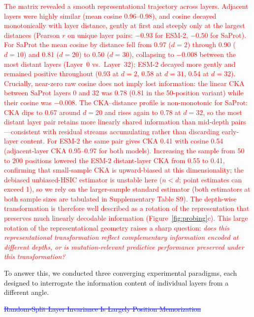\documentclass[11pt,a4paper]{article}
\newcommand{\rev}[1]{\textcolor{red}{#1}}
\begin{document}
\textcolor{red}{The matrix revealed a smooth representational trajectory across layers. Adjacent layers
were highly similar \rev{(mean cosine 0.96--0.98)}, and \rev{cosine decayed
monotonically with layer distance, gently at first and steeply only at the
largest distances (Pearson $r$ on unique layer pairs: $-0.93$ for ESM-2,
$-0.50$ for SaProt). For SaProt the mean cosine by distance fell from 0.97
($d=2$) through 0.90 ($d=10$) and 0.81 ($d=20$) to 0.50 ($d=30$), collapsing to
$-0.008$ between the most distant layers (Layer~0 vs.\ Layer~32); ESM-2 decayed
more gently and remained positive throughout (0.93 at $d=2$, 0.58 at $d=31$,
0.54 at $d=32$). Crucially, near-zero raw cosine does not imply lost
information: the linear CKA between SaProt layers 0 and 32 was 0.78 (0.81 in
the 50-position variant) while their cosine was $-0.008$. The CKA--distance
profile is non-monotonic for SaProt: CKA dips to 0.67 around $d=20$ and rises
again to 0.78 at $d=32$, so the most distant layer pair retains more linearly
shared information than mid-depth pairs---consistent with residual streams
accumulating rather than discarding early-layer content. For ESM-2 the same
pair gives CKA 0.41 with cosine 0.54 (adjacent-layer CKA 0.95--0.97 for both
models). Increasing the sample from 50 to 200 positions lowered the ESM-2
distant-layer CKA from 0.55 to 0.41, confirming that small-sample CKA is
upward-biased at this dimensionality; the debiased unbiased-HSIC estimator is
unstable here ($n < d$; point estimates can exceed 1), so we rely on the
larger-sample standard estimator (both estimators at both sample sizes are
tabulated in Supplementary Table S9). The depth-wise transformation is therefore
well described as a rotation of the representation that preserves much
linearly decodable information (Figure~\ref{fig:probing}c).} This large
rotation of the representational geometry raises a sharp question: \emph{does this
representational transformation reflect complementary information encoded at different
depths, or is mutation-relevant predictive performance preserved under this transformation?}}

To answer this, we conducted three converging experimental paradigms, each designed to
interrogate the information content of individual layers from a different angle.

\textcolor{blue}{\sout{Random-Split Layer Invariance Is Largely Position Memorization}}
\end{document}
